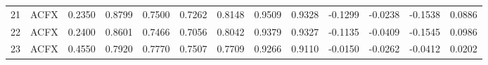 \begin{tabular}{rlrrrrrrrrrrr}
    21 &   ACFX &  0.2350 &          0.8799 &  0.7500 &            0.7262 &          0.8148 &     0.9509 &      0.9328 &          -0.1299 &        -0.0238 &    -0.1538 &                          0.0886 \\
    22 &   ACFX &  0.2400 &          0.8601 &  0.7466 &            0.7056 &          0.8042 &     0.9379 &      0.9327 &          -0.1135 &        -0.0409 &    -0.1545 &                          0.0986 \\
    23 &   ACFX &  0.4550 &          0.7920 &  0.7770 &            0.7507 &          0.7709 &     0.9266 &      0.9110 &          -0.0150 &        -0.0262 &    -0.0412 &                          0.0202 \\
\bottomrule
\end{tabular}
